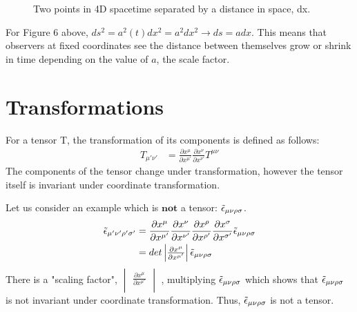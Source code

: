 \documentclass[11pt]{article}
\begin{document}
\begin{example}
\begin{figure} [H]
\begin{centering}
\begin{tikzpicture}[x=0.75pt,y=0.75pt,yscale=-1,xscale=1]
\end{tikzpicture}
        \caption{Two points in 4D spacetime separated by a distance in space, dx.}
        \end{centering}
    \end{figure}
    For Figure 6 above, $ds^2 = a^2(t)dx^2 = a^2dx^2 \to ds = adx$. This means that observers at fixed coordinates see the distance between themselves grow or shrink in time depending on the value of $a$, the scale factor.
    
    \end{example}
    
    \section{Transformations}
    For a tensor T, the transformation of its components is defined as follows:
        \begin{equation}
            \begin{aligned}
           T_{\mu ' \nu '} &= \frac{\partial x^\mu}{\partial x^{\mu '}} \frac{\partial x^\nu}{\partial x^{\nu '}} T^{\mu \nu}
            \end{aligned}
        \end{equation}
    The components of the tensor change under transformation, however the tensor itself is invariant under coordinate transformation.
    \begin{example}
    Let us consider an example which is $\boldsymbol{not}$ a tensor: $\Tilde{\epsilon}_{\mu\nu\rho\sigma}$.
        \begin{equation}
            \begin{aligned}
           \Tilde{\epsilon}_{\mu '\nu '\rho '\sigma '} &= \frac{\partial x^\mu}{\partial x^{\mu '}} \frac{\partial x^\nu}{\partial x^{\nu '}} \frac{\partial x^\rho}{\partial x^{\rho '}} \frac{\partial x^\sigma}{\partial x^{\sigma '}} \Tilde{\epsilon}_{\mu\nu\rho\sigma}\\
           &= det \begin{vmatrix}
                    \frac{\partial x^\mu}{\partial x^{\mu '}}  \\
                    \end{vmatrix} \Tilde{\epsilon}_{\mu\nu\rho\sigma}
            \end{aligned}
        \end{equation}
    There is a "scaling factor", $\begin{vmatrix}
                    \frac{\partial x^\mu}{\partial x^{\mu '}}  \\
                    \end{vmatrix}$
    , multiplying $\Tilde{\epsilon}_{\mu\nu\rho\sigma}$ which shows that $\Tilde{\epsilon}_{\mu\nu\rho\sigma}$ is not invariant under coordinate transformation. Thus, $\Tilde{\epsilon}_{\mu\nu\rho\sigma}$ is not a tensor. 
    \end{example}
\end{document}
